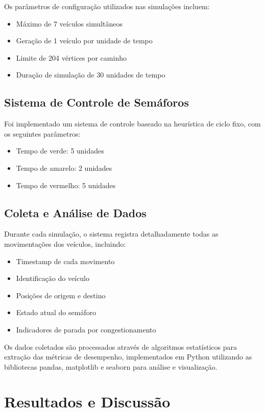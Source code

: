 \documentclass[12pt,a4paper]{article}
\begin{document}
Os parâmetros de configuração utilizados nas simulações incluem:
\begin{itemize}
    \item Máximo de 7 veículos simultâneos
    \item Geração de 1 veículo por unidade de tempo
    \item Limite de 204 vértices por caminho
    \item Duração de simulação de 30 unidades de tempo
\end{itemize}

\subsection{Sistema de Controle de Semáforos}

Foi implementado um sistema de controle baseado na heurística de ciclo fixo, com os seguintes parâmetros:
\begin{itemize}
    \item Tempo de verde: 5 unidades
    \item Tempo de amarelo: 2 unidades  
    \item Tempo de vermelho: 5 unidades
\end{itemize}

\subsection{Coleta e Análise de Dados}

Durante cada simulação, o sistema registra detalhadamente todas as movimentações dos veículos, incluindo:
\begin{itemize}
    \item Timestamp de cada movimento
    \item Identificação do veículo
    \item Posições de origem e destino
    \item Estado atual do semáforo
    \item Indicadores de parada por congestionamento
\end{itemize}

Os dados coletados são processados através de algoritmos estatísticos para extração das métricas de desempenho, implementados em Python utilizando as bibliotecas pandas, matplotlib e seaborn para análise e visualização.

\section{Resultados e Discussão}
\end{document}
